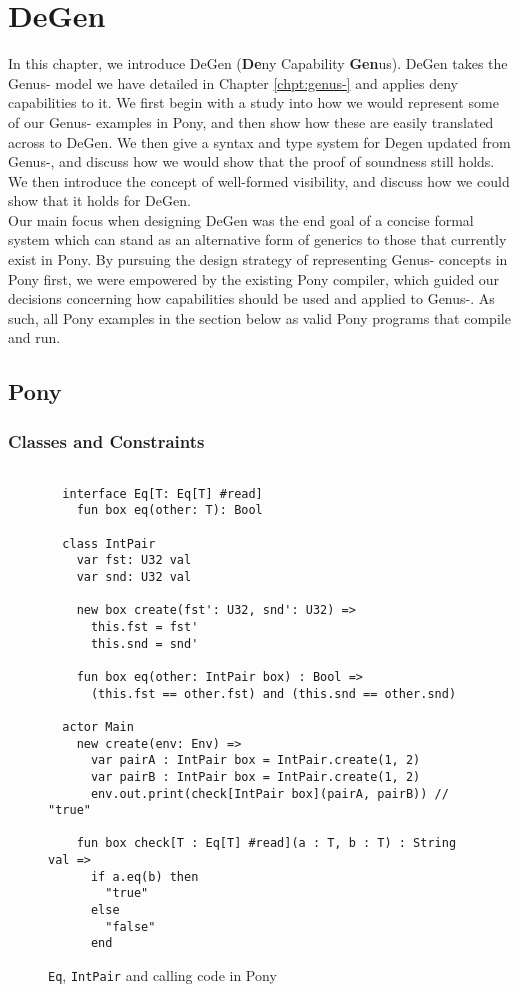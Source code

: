 \chapter{DeGen} \label{chpt:degen}

In this chapter, we introduce DeGen (\textbf{De}ny Capability \textbf{Gen}us). DeGen takes the Genus- model we have detailed in Chapter \ref{chpt:genus-} and applies deny capabilities to it. We first begin with a study into how we would represent some of our Genus- examples in Pony, and then show how these are easily translated across to DeGen. We then give a syntax and type system for Degen updated from Genus-, and discuss how we would show that the proof of soundness still holds. We then introduce the concept of well-formed visibility, and discuss how we could show that it holds for DeGen. \\

Our main focus when designing DeGen was the end goal of a concise formal system which can stand as an alternative form of generics to those that currently exist in Pony. By pursuing the design strategy of representing Genus- concepts in Pony first, we were empowered by the existing Pony compiler, which guided our decisions concerning how capabilities should be used and applied to Genus-. As such, all Pony examples in the section below as valid Pony programs that compile and run.

\section{Pony} \label{pony-degen}

\subsection{Classes and Constraints}

\begin{figure}[H]
    \centering
    \begin{verbatim}
    
  interface Eq[T: Eq[T] #read]
    fun box eq(other: T): Bool
  
  class IntPair
    var fst: U32 val
    var snd: U32 val
  
    new box create(fst': U32, snd': U32) =>
      this.fst = fst'
      this.snd = snd'
    
    fun box eq(other: IntPair box) : Bool =>
      (this.fst == other.fst) and (this.snd == other.snd)

  actor Main
    new create(env: Env) =>
      var pairA : IntPair box = IntPair.create(1, 2)
      var pairB : IntPair box = IntPair.create(1, 2)
      env.out.print(check[IntPair box](pairA, pairB)) // "true"
      
    fun box check[T : Eq[T] #read](a : T, b : T) : String val =>
      if a.eq(b) then 
        "true"
      else 
        "false"
      end
    \end{verbatim}
    \caption{\texttt{Eq}, \texttt{IntPair} and calling code in Pony}
    \label{fig:pony-eq}
\end{figure}

